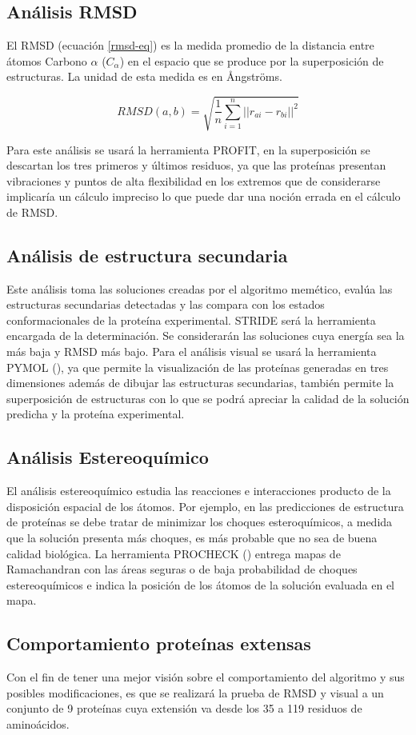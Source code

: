 \subsection{Análisis RMSD}
El RMSD (ecuación \ref{rmsd-eq}) es la medida promedio de la distancia entre átomos Carbono $\alpha$ ($C_{\alpha}$) en el espacio que se produce por la superposición de estructuras. La unidad de esta medida es en Ångströms.

\begin{equation}
RMSD(a,b) = \sqrt{\frac{1}{n}\sum_{i=1}^{n}||r_{ai} - r_{bi}||^2}
\label{rmsd-eq}
\end{equation}

Para este análisis se usará la herramienta PROFIT, en la superposición se descartan los tres primeros y últimos residuos, ya que las proteínas presentan vibraciones y puntos de alta flexibilidad en los extremos que de considerarse implicaría un cálculo impreciso lo que puede dar una noción errada en el cálculo de RMSD. 

\subsection{Análisis de estructura secundaria}
Este análisis toma las soluciones creadas por el algoritmo memético, evalúa las estructuras secundarias detectadas y las compara con los estados conformacionales de la proteína experimental. STRIDE será la herramienta encargada de la determinación.
Se considerarán las soluciones cuya energía sea la más baja y RMSD más bajo. Para el análisis visual se usará la herramienta PYMOL (\citealp{pymol}), ya que permite la visualización de las proteínas generadas en tres dimensiones además de dibujar las estructuras secundarias, también permite la superposición de estructuras con lo que se podrá apreciar la calidad de la solución predicha y la proteína experimental.

\subsection{Análisis Estereoquímico}
El análisis estereoquímico estudia las reacciones e interacciones producto de la disposición espacial de los átomos. Por ejemplo, en las predicciones de estructura de proteínas se debe tratar de minimizar los choques esteroquímicos, a medida que la solución presenta más choques, es más probable que no sea de buena calidad biológica. La herramienta PROCHECK (\citealp{procheck}) entrega mapas de Ramachandran con las áreas seguras o de baja probabilidad de choques estereoquímicos e indica la posición de los átomos de la solución evaluada en el mapa. 

\subsection{Comportamiento proteínas extensas}

Con el fin de tener una mejor visión sobre el comportamiento del algoritmo y sus posibles modificaciones, es que se realizará la prueba de RMSD y visual a un conjunto de 9 proteínas cuya extensión va desde los 35 a 119 residuos de aminoácidos.